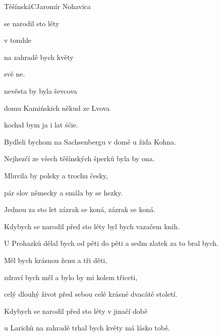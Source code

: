 \setcounter{page}{86}
\begin{song}{Těšínská}{C}{Jaromír Nohavica}

\begin{SBVerse}

 se narodil  sto léty  

v tomhle   {}

 na zahradě  bych květy 

své ne.

 nevěsta by byla  ševcova

 domu Kamińskich někud ze Lvova

kochał bym ja i   lat śćie.      

\end{SBVerse}

\begin{SBVerse}

Bydleli bychom na Sachsenbergu v domě u žida Kohna.

Nejhezčí ze všech těšínských šperků byla by ona.

Mluvila by polsky a trochu česky,

pár slov německy a smála by se hezky.

Jednou za sto let zázrak se koná, zázrak se koná.

\end{SBVerse}

\begin{SBVerse}

Kdybych se narodil před sto léty byl bych vazačem knih.

U Prohazků dělal bych od pěti do pěti a sedm zlatek za to bral bych.

Měl bych krásnou ženu a tři děti,

zdraví bych měl a bylo by mi kolem třiceti,

celý dlouhý život před sebou celé krásné dvacáté století.

\end{SBVerse}

\begin{SBVerse}

Kdybych se narodil před sto léty v jinačí době

u Larichů na zahradě trhal bych květy má lásko tobě.


\end{SBVerse}
\end{song}
